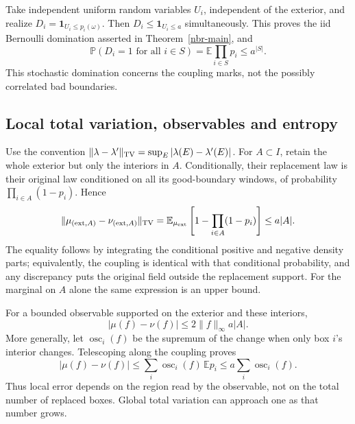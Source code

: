 \documentclass[11pt]{article}
\theoremstyle{remark}
\begin{document}
Take independent uniform random variables \(U_i\), independent of the
exterior, and realize \(D_i=\mathbf1_{U_i\le p_i(\omega)}\).
Then \(D_i\le\mathbf1_{U_i\le a}\) simultaneously. This proves the
iid Bernoulli domination asserted in Theorem~\ref{nbr-main}, and
\begin{equation}
 \mathbb P(D_i=1\text{ for all }i\in S)
 =\mathbb E\prod_{i\in S}p_i\le a^{|S|}.
 \label{nbr-discrepancy-joint}
\end{equation}
This stochastic domination concerns the coupling marks, not the
possibly correlated bad boundaries.

\subsection{Local total variation, observables and entropy}
\label{nbr-local-section}

Use the convention
\(\|\lambda-\lambda'\|_{\rm TV}=\sup_E|\lambda(E)-\lambda'(E)|\).
For \(A\subset I\), retain the whole exterior but only the interiors
in \(A\). Conditionally, their replacement law is their original law
conditioned on all its good-boundary windows, of probability
\(\prod_{i\in A}(1-p_i)\). Hence
\begin{equation}
 \|\mu_{({\rm ext},A)}-\nu_{({\rm ext},A)}\|_{\rm TV}
 =\mathbb E_{\mu_{\rm ext}}
       \left[1-\prod_{i\in A}(1-p_i)\right]
 \le a|A|.
 \label{nbr-local-tv}
\end{equation}
The equality follows by integrating the conditional positive and
negative density parts; equivalently, the coupling is identical with
that conditional probability, and any discrepancy puts the original
field outside the replacement support. For the marginal on \(A\)
alone the same expression is an upper bound.

For a bounded observable supported on the exterior and these interiors,
\begin{equation}
 |\mu(f)-\nu(f)|\le2\|f\|_\infty a|A|.
 \label{nbr-local-observable}
\end{equation}
More generally, let \(\operatorname{osc}_i(f)\) be the supremum of the
change when only box \(i\)'s interior changes. Telescoping along the
coupling proves
\begin{equation}
 |\mu(f)-\nu(f)|
 \le\sum_i\operatorname{osc}_i(f)\,\mathbb E p_i
 \le a\sum_i\operatorname{osc}_i(f).
 \label{nbr-oscillation}
\end{equation}
Thus local error depends on the region read by the observable, not on
the total number of replaced boxes. Global total variation can approach
one as that number grows.
\end{document}
